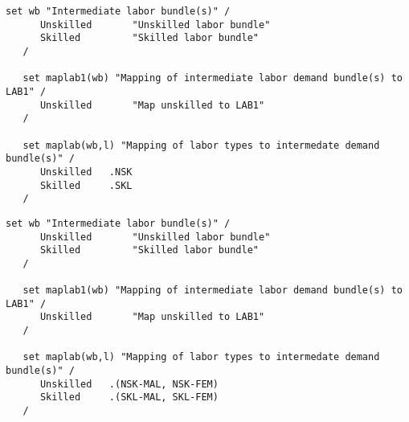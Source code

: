 \begin{lstlisting}[language=GAMS, caption={Two labor categories in separate bundles}]
   set wb "Intermediate labor bundle(s)" /
      Unskilled       "Unskilled labor bundle"
      Skilled         "Skilled labor bundle"
   /

   set maplab1(wb) "Mapping of intermediate labor demand bundle(s) to LAB1" /
      Unskilled       "Map unskilled to LAB1"
   /

   set maplab(wb,l) "Mapping of labor types to intermedate demand bundle(s)" /
      Unskilled   .NSK
      Skilled     .SKL
   /
\end{lstlisting}

\begin{lstlisting}[language=GAMS, caption={Two labor skills by gender}]
   set wb "Intermediate labor bundle(s)" /
      Unskilled       "Unskilled labor bundle"
      Skilled         "Skilled labor bundle"
   /

   set maplab1(wb) "Mapping of intermediate labor demand bundle(s) to LAB1" /
      Unskilled       "Map unskilled to LAB1"
   /

   set maplab(wb,l) "Mapping of labor types to intermedate demand bundle(s)" /
      Unskilled   .(NSK-MAL, NSK-FEM)
      Skilled     .(SKL-MAL, SKL-FEM)
   /
\end{lstlisting}


